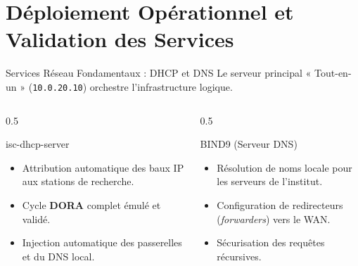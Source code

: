\section{Déploiement Opérationnel et Validation des Services}

\begin{frame}{Services Réseau Fondamentaux : DHCP et DNS}
    Le serveur principal « Tout-en-un » (\texttt{10.0.20.10}) orchestre l'infrastructure logique.

    \vspace{0.2cm}
    \begin{columns}[T]
        \begin{column}{0.5\textwidth}
            \begin{block}{isc-dhcp-server}
                \begin{itemize}
                    \item Attribution automatique des baux IP aux stations de recherche.
                    \item Cycle \textbf{DORA} complet émulé et validé.
                    \item Injection automatique des passerelles et du DNS local.
                \end{itemize}
            \end{block}
        \end{column}
        
        \begin{column}{0.5\textwidth}
            \begin{block}{BIND9 (Serveur DNS)}
                \begin{itemize}
                    \item Résolution de noms locale pour les serveurs de l'institut.
                    \item Configuration de redirecteurs (\textit{forwarders}) vers le WAN.
                    \item Sécurisation des requêtes récursives.
                \end{itemize}
            \end{block}
        \end{column}
    \end{columns}
\end{frame}


